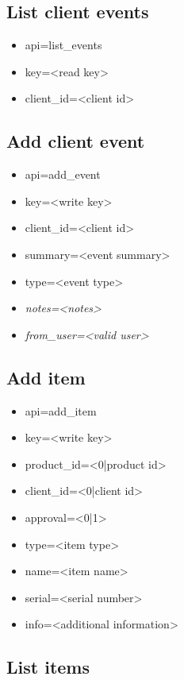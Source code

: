 \documentclass[11pt]{article}
\begin{document}
\subsection{List client events}

\begin{itemize}
\item api=list\_events
\item key=<read key>
\item client\_id=<client id>
\end{itemize}

\subsection{Add client event}

\begin{itemize}
\item api=add\_event
\item key=<write key>
\item client\_id=<client id>
\item summary=<event summary>
\item type=<event type>
\item \textit{notes=<notes>}
\item \textit{from\_user=<valid user>}
\end{itemize}

\subsection{Add item}

\begin{itemize}
\item api=add\_item
\item key=<write key>
\item product\_id=<0|product id>
\item client\_id=<0|client id>
\item approval=<0|1>
\item type=<item type>
\item name=<item name>
\item serial=<serial number>
\item info=<additional information>
\end{itemize}

\subsection{List items}
\end{document}
